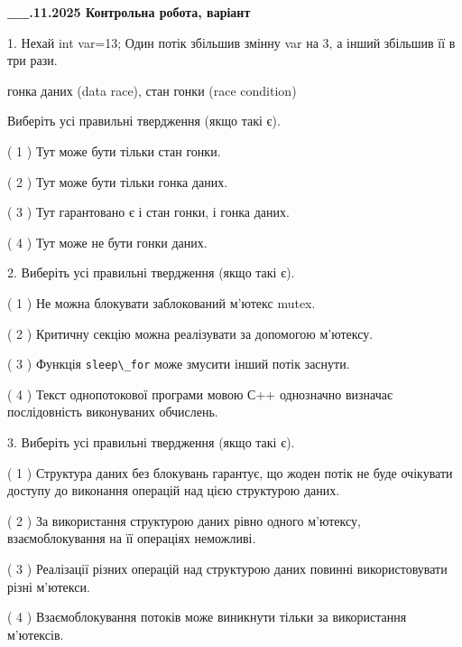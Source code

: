 \documentclass[12pt, ukrainian]{article}
\def\code#1{\Verb!#1!}
\begin{document}
\newpage
\begin {large}

\textbf{\_\_.11.2025 Контрольна робота, варіант  }\par


{
1. Нехай int var=13; Один потік збільшив змінну var на 3, а інший збільшив її в три рази.

гонка даних (data race), стан гонки (race condition)

Виберіть усі правильні твердження (якщо такі є).\par
\vspace{2mm}
( 1 ) Тут може бути тільки стан гонки.%

( 2 ) Тут може бути тільки гонка даних.%

( 3 ) Тут гарантовано є і стан гонки, і гонка даних.%

( 4 ) Тут може не бути гонки даних.%


2. Виберіть усі правильні твердження (якщо такі є).\par
\vspace{2mm}

( 1 ) Не можна блокувати заблокований м’ютекс mutex.%

( 2 ) Критичну секцію можна реалізувати за допомогою м’ютексу.%

( 3 ) Функція \code{sleep\_for} може змусити інший потік заснути.%

( 4 ) Текст однопотокової програми мовою С++ однозначно визначає послідовність виконуваних обчислень.%


3. Виберіть усі правильні твердження (якщо такі є).\par
\vspace{2mm}

( 1 ) Структура даних без блокувань гарантує, що жоден потік не буде очікувати доступу до виконання операцій над цією структурою даних.%

( 2 ) За використання структурою даних рівно одного м’ютексу, взаємоблокування на її операціях неможливі.%

( 3 ) Реалізації різних операцій над структурою даних повинні використовувати різні м’ютекси.%

( 4 ) Взаємоблокування потоків може виникнути тільки за використання м’ютексів.%


}
\end{large}
\end{document}
